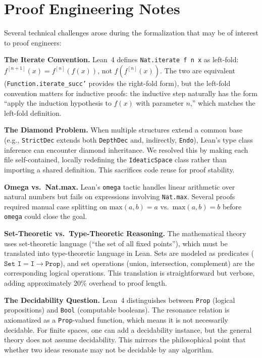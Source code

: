 \documentclass[11pt,openany]{book}
\theoremstyle{definition}
\theoremstyle{plain}
\theoremstyle{remark}
\begin{document}
\section{Proof Engineering Notes}

Several technical challenges arose during the formalization that may be of interest to proof engineers:

\textbf{The Iterate Convention.} Lean~4 defines \texttt{Nat.iterate f n x} as left-fold: $f^{[n+1]}(x) = f^{[n]}(f(x))$, not $f(f^{[n]}(x))$. The two are equivalent (\texttt{Function.iterate\_succ'} provides the right-fold form), but the left-fold convention matters for inductive proofs: the inductive step naturally has the form ``apply the induction hypothesis to $f(x)$ with parameter $n$,'' which matches the left-fold definition.

\textbf{The Diamond Problem.} When multiple structures extend a common base (e.g., \texttt{StrictDec} extends both \texttt{DepthDec} and, indirectly, \texttt{Endo}), Lean's type class inference can encounter diamond inheritance. We resolved this by making each file self-contained, locally redefining the \texttt{IdeaticSpace} class rather than importing a shared definition. This sacrifices code reuse for proof stability.

\textbf{Omega vs.\ Nat.max.} Lean's \texttt{omega} tactic handles linear arithmetic over natural numbers but fails on expressions involving \texttt{Nat.max}. Several proofs required manual case splitting on $\text{max}(a, b) = a$ vs.\ $\text{max}(a, b) = b$ before \texttt{omega} could close the goal.

\textbf{Set-Theoretic vs.\ Type-Theoretic Reasoning.} The mathematical theory uses set-theoretic language (``the set of all fixed points''), which must be translated into type-theoretic language in Lean. Sets are modeled as predicates ($\texttt{Set I} = \texttt{I} \to \texttt{Prop}$), and set operations (union, intersection, complement) are the corresponding logical operations. This translation is straightforward but verbose, adding approximately 20\% overhead to proof length.

\textbf{The Decidability Question.} Lean~4 distinguishes between \texttt{Prop} (logical propositions) and \texttt{Bool} (computable booleans). The resonance relation is axiomatized as a \texttt{Prop}-valued function, which means it is not necessarily decidable. For finite spaces, one can add a decidability instance, but the general theory does not assume decidability. This mirrors the philosophical point that whether two ideas resonate may not be decidable by any algorithm.
\end{document}
